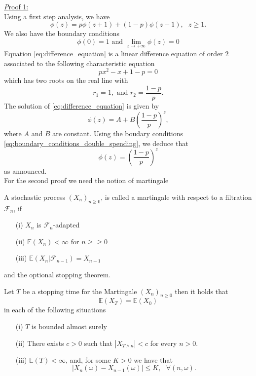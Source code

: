 \underline{\textit Proof 1:}\\
Using a first step analysis, we have 
\begin{equation}\label{eq:difference_equation}
\phi(z) = p\phi(z+1)+(1-p)\phi(z-1),\text{ }z\geq1.
\end{equation}
We also have the boundary conditions
\begin{equation}\label{eq:boundary_conditions_double_spending}
\phi(0) = 1\text{ and }\underset{z\rightarrow +\infty}{\lim}\phi(z) = 0
\end{equation}
Equation \eqref{eq:difference_equation} is a linear difference equation of order $2$ associated to the following characteristic equation
$$
px^2 - x + 1-p = 0
$$
which has two roots on the real line with 
$$
r_1 = 1, \text{ and }r_2 = \frac{1-p}{p}.
$$
The solution of \eqref{eq:difference_equation} is given by 
$$
\phi(z)=A+B\left(\frac{1-p}{p}\right)^z,
$$
where $A$ and $B$ are constant. Using the boudary conditions \eqref{eq:boundary_conditions_double_spending}, we deduce that
$$
\phi(z) = \left(\frac{1-p}{p}\right)^z
$$
as announced.\\
For the second proof we need the notion of martingale
\begin{definition}
A stochastic process $(X_n)_{n\geq0}$, is called a martingale with respect to a filtration $\mathcal{F}_n$, if
\begin{itemize}
  \item[(i)] $X_n$ is $\mathcal{F}_n$-adapted
  \item[(ii)] $\mathbb{E}(X_n)<\infty\text{ for }n\geq\geq0$ 
  \item[(iii)] $\mathbb{E}(X_n|\mathcal{F}_{n-1}) = X_{n-1}$
\end{itemize} 
\end{definition}
\noindent and the optional stopping theorem.
\begin{theo}
Let $T$ be a stopping time for the Martingale $(X_n)_{n\geq0}$ then it holds that 
$$
\mathbb{E}(X_T) = \mathbb{E}(X_0) 
$$
in each of the following situations
\begin{itemize}
\item[(i)] $T$ is bounded almost surely 
\item[(ii)] There exists $c>0$ such that $|X_{T\land n}|<c$ for every $n>0$.
\item[(iii)] $\mathbb{E}(T)<\infty$, and, for some $K>0$ we have that 
$$
|X_n(\omega) - X_{n-1}(\omega)|\leq K,\text{ }\forall (n,\omega).
$$
\end{itemize}

\end{theo}
